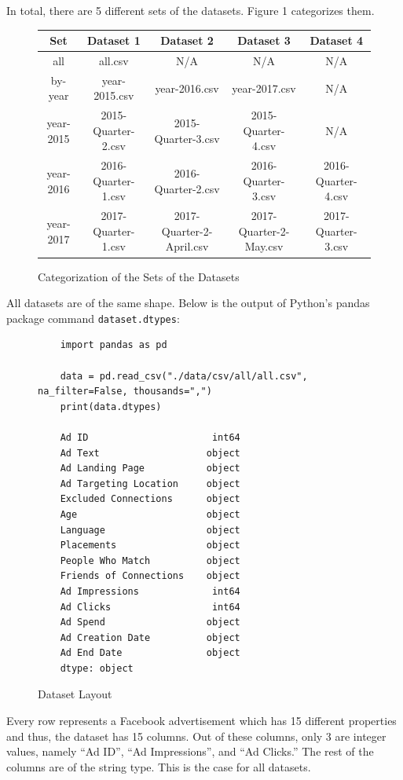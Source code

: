 \documentclass{article}
\begin{document}
\medskip

In total, there are 5 different sets of the datasets.
Figure 1 categorizes them.

\begin{figure}[H]
  \centering
  \begin{tabular}{*{5}{c}}
    \toprule
    Set & Dataset 1 & Dataset 2 & Dataset 3 & Dataset 4\\
    \midrule
    all  & all.csv & N/A & N/A & N/A\\
    \midrule
    by-year & year-2015.csv & year-2016.csv & year-2017.csv & N/A\\
    \midrule
    year-2015 & 2015-Quarter-2.csv & 2015-Quarter-3.csv & 2015-Quarter-4.csv & N/A\\
    \midrule
    year-2016 & 2016-Quarter-1.csv & 2016-Quarter-2.csv & 2016-Quarter-3.csv & 2016-Quarter-4.csv\\
    \midrule
    year-2017 & 2017-Quarter-1.csv & 2017-Quarter-2-April.csv & 2017-Quarter-2-May.csv & 2017-Quarter-3.csv\\
    \bottomrule
  \end{tabular}
  \caption{Categorization of the Sets of the Datasets}
\end{figure}

All datasets are of the same shape. Below is the output of Python's pandas
package command \texttt{dataset.dtypes}:

\begin{figure}[H]
  \begin{verbatim}
    import pandas as pd

    data = pd.read_csv("./data/csv/all/all.csv", na_filter=False, thousands=",")
    print(data.dtypes)

    Ad ID                      int64
    Ad Text                   object
    Ad Landing Page           object
    Ad Targeting Location     object
    Excluded Connections      object
    Age                       object
    Language                  object
    Placements                object
    People Who Match          object
    Friends of Connections    object
    Ad Impressions             int64
    Ad Clicks                  int64
    Ad Spend                  object
    Ad Creation Date          object
    Ad End Date               object
    dtype: object
  \end{verbatim}
  \caption{Dataset Layout}
\end{figure}

Every row represents a Facebook advertisement which has 15 different properties
and thus, the dataset has 15 columns. Out of these columns, only 3 are integer
values, namely ``Ad ID'', ``Ad Impressions'', and ``Ad Clicks.'' The rest of
the columns are of the string type. This is the case for all datasets.
\end{document}
